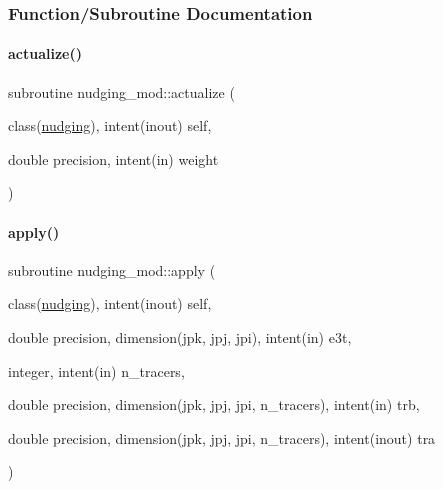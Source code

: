 \subsubsection{Function/\+Subroutine Documentation}
\mbox{\label{namespacenudging__mod_a0fed21a76bcb2b1c360940bfbe8b68cf}} 
\paragraph{\texorpdfstring{actualize()}{actualize()}}
{\footnotesize\ttfamily subroutine nudging\+\_\+mod\+::actualize (\begin{DoxyParamCaption}\item[{class(\mbox{\hyperlink{structnudging__mod_1_1nudging}{nudging}}), intent(inout)}]{self,  }\item[{double precision, intent(in)}]{weight }\end{DoxyParamCaption})\hspace{0.3cm}{\ttfamily [private]}}

\mbox{\label{namespacenudging__mod_a1ebb358bce355373b850b0d16484c548}} 
\paragraph{\texorpdfstring{apply()}{apply()}}
{\footnotesize\ttfamily subroutine nudging\+\_\+mod\+::apply (\begin{DoxyParamCaption}\item[{class(\mbox{\hyperlink{structnudging__mod_1_1nudging}{nudging}}), intent(inout)}]{self,  }\item[{double precision, dimension(jpk, jpj, jpi), intent(in)}]{e3t,  }\item[{integer, intent(in)}]{n\+\_\+tracers,  }\item[{double precision, dimension(jpk, jpj, jpi, n\+\_\+tracers), intent(in)}]{trb,  }\item[{double precision, dimension(jpk, jpj, jpi, n\+\_\+tracers), intent(inout)}]{tra }\end{DoxyParamCaption})\hspace{0.3cm}{\ttfamily [private]}}

\mbox{\label{namespacenudging__mod_a57e5db057d271bd14f1b97070e0d9c41}} 

